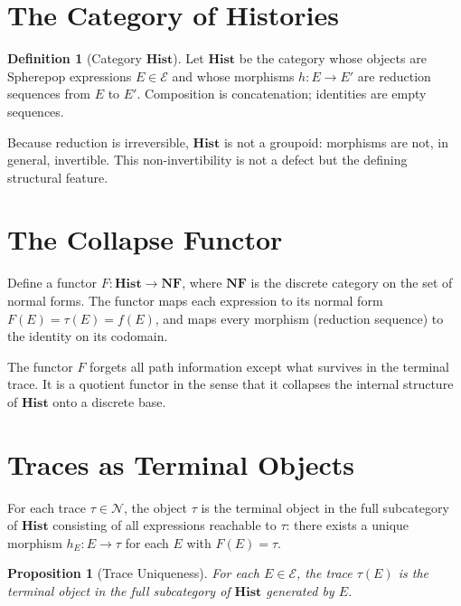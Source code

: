 \documentclass[12pt, oneside]{amsbook}
\theoremstyle{plain}
\newtheorem{proposition}[theorem]{Proposition}
\theoremstyle{definition}
\newtheorem{definition}[theorem]{Definition}
\theoremstyle{remark}
\newcommand{\Expr}{\mathcal{E}}
\newcommand{\NF}{\mathcal{N}}
\newcommand{\evalf}{f}
\newcommand{\trace}{\tau}
\begin{document}
\section{The Category of Histories}
\label{app:cat:hist}

\begin{definition}[Category $\mathbf{Hist}$]
  Let $\mathbf{Hist}$ be the category whose objects are Spherepop expressions
  $E \in \Expr$ and whose morphisms $h : E \to E'$ are reduction sequences from
  $E$ to $E'$. Composition is concatenation; identities are empty sequences.
\end{definition}

Because reduction is irreversible, $\mathbf{Hist}$ is not a groupoid: morphisms
are not, in general, invertible. This non-invertibility is not a defect but the
defining structural feature.

\section{The Collapse Functor}
\label{app:cat:functor}

Define a functor $F : \mathbf{Hist} \to \mathbf{NF}$, where $\mathbf{NF}$ is
the discrete category on the set of normal forms. The functor maps each
expression to its normal form $F(E) = \trace(E) = \evalf(E)$, and maps every
morphism (reduction sequence) to the identity on its codomain.

The functor $F$ forgets all path information except what survives in the
terminal trace. It is a quotient functor in the sense that it collapses the
internal structure of $\mathbf{Hist}$ onto a discrete base.

\section{Traces as Terminal Objects}
\label{app:cat:terminal}

For each trace $\tau \in \NF$, the object $\tau$ is the terminal object in
the full subcategory of $\mathbf{Hist}$ consisting of all expressions reachable
to $\tau$: there exists a unique morphism $h_E : E \to \tau$ for each $E$ with
$F(E) = \tau$.

\begin{proposition}[Trace Uniqueness]
\label{prop:terminal}
  For each $E \in \Expr$, the trace $\trace(E)$ is the terminal object in
  the full subcategory of $\mathbf{Hist}$ generated by $E$.
\end{proposition}
\end{document}
